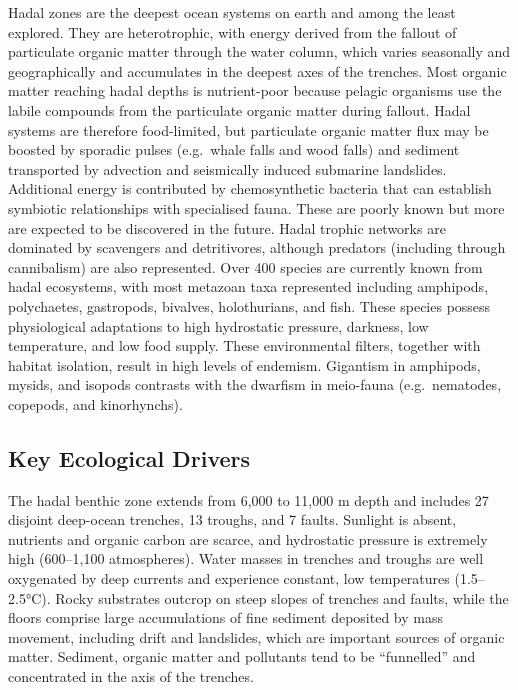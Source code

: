 \documentclass[
  letterpaper,
  DIV=11,
  numbers=noendperiod]{scrartcl}
\begin{document}
Hadal zones are the deepest ocean systems on earth and among the least
explored. They are heterotrophic, with energy derived from the fallout
of particulate organic matter through the water column, which varies
seasonally and geographically and accumulates in the deepest axes of the
trenches. Most organic matter reaching hadal depths is nutrient-poor
because pelagic organisms use the labile compounds from the particulate
organic matter during fallout. Hadal systems are therefore food-limited,
but particulate organic matter flux may be boosted by sporadic pulses
(e.g.~whale falls and wood falls) and sediment transported by advection
and seismically induced submarine landslides. Additional energy is
contributed by chemosynthetic bacteria that can establish symbiotic
relationships with specialised fauna. These are poorly known but more
are expected to be discovered in the future. Hadal trophic networks are
dominated by scavengers and detritivores, although predators (including
through cannibalism) are also represented. Over 400 species are
currently known from hadal ecosystems, with most metazoan taxa
represented including amphipods, polychaetes, gastropods, bivalves,
holothurians, and fish. These species possess physiological adaptations
to high hydrostatic pressure, darkness, low temperature, and low food
supply. These environmental filters, together with habitat isolation,
result in high levels of endemism. Gigantism in amphipods, mysids, and
isopods contrasts with the dwarfism in meio-fauna (e.g.~nematodes,
copepods, and kinorhynchs).

\subsection{Key Ecological Drivers}\label{key-ecological-drivers-45}

The hadal benthic zone extends from 6,000 to 11,000 m depth and includes
27 disjoint deep-ocean trenches, 13 troughs, and 7 faults. Sunlight is
absent, nutrients and organic carbon are scarce, and hydrostatic
pressure is extremely high (600--1,100 atmospheres). Water masses in
trenches and troughs are well oxygenated by deep currents and experience
constant, low temperatures (1.5--2.5°C). Rocky substrates outcrop on
steep slopes of trenches and faults, while the floors comprise large
accumulations of fine sediment deposited by mass movement, including
drift and landslides, which are important sources of organic matter.
Sediment, organic matter and pollutants tend to be ``funnelled'' and
concentrated in the axis of the trenches.
\end{document}
